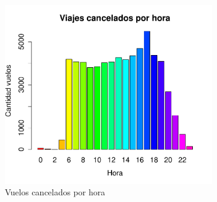 \documentclass[12pt]{article}
\numberwithin{equation}{section}
\numberwithin{table}{section}
\numberwithin{figure}{section}
\begin{document}
\begin{figure}
        \centering
        ~
        \begin{subfigure}[b]{0.6\textwidth}
                \includegraphics[width=1\columnwidth]{imagenes/cancelados/viajes-cancelados-por-hora}
                \caption{Vuelos cancelados por hora}
        \end{subfigure}
        ~
        \begin{subfigure}[b]{0.3\textwidth}
\begin{tabular}{@{}cc@{}}


\end{tabular}
\end{subfigure}
\end{figure}
\end{document}
